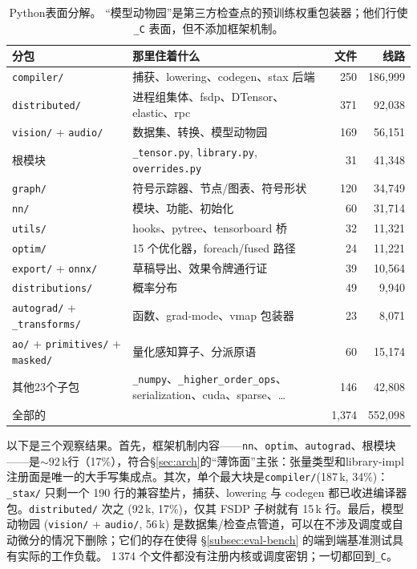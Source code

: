 \begin{table}[H]
\centering
\caption{Python表面分解。 “模型动物园”是第三方检查点的预训练权重包装器；他们行使 \texttt{\_C} 表面，但不添加框架机制。}
\label{tab:pybreakdown}
\small
\begin{tabular}{llrr}
\toprule
分包 & 那里住着什么 & 文件 & 线路 \\
\midrule
\texttt{compiler/} & 捕获、lowering、codegen、stax 后端 & 250 & 186{,}999 \\
\texttt{distributed/} & 进程组集体、fsdp、DTensor、elastic、rpc & 371 & 92{,}038 \\
\texttt{vision/} + \texttt{audio/} & 数据集、转换、模型动物园 & 169 & 56{,}151 \\
根模块 & \texttt{\_tensor.py}, \texttt{library.py}, \texttt{overrides.py} & 31 & 41{,}348 \\
\texttt{graph/} & 符号示踪器、节点/图表、符号形状 & 120 & 34{,}749 \\
\texttt{nn/} & 模块、功能、初始化 & 60 & 31{,}714 \\
\texttt{utils/} & hooks、pytree、tensorboard 桥 & 32 & 11{,}321 \\
\texttt{optim/} & 15 个优化器，foreach/fused 路径 & 24 & 11{,}221 \\
\texttt{export/} + \texttt{onnx/} & 草稿导出、效果令牌通行证 & 39 & 10{,}564 \\
\texttt{distributions/} & 概率分布 & 49 & 9{,}940 \\
\texttt{autograd/} + \texttt{\_transforms/} & 函数、grad-mode、vmap 包装器 & 23 & 8{,}071 \\
\texttt{ao/} + \texttt{primitives/} + \texttt{masked/} & 量化感知算子、分派原语 & 60 & 15{,}174 \\
其他23个子包 & \texttt{\_numpy}、\texttt{\_higher\_order\_ops}、serialization、cuda、sparse、\dots & 146 & 42{,}808 \\
\midrule
全部的 &  & 1{,}374 & 552{,}098 \\
\bottomrule
\end{tabular}
\end{table}

以下是三个观察结果。首先，框架机制内容——\texttt{nn}、\texttt{optim}、\texttt{autograd}、根模块——是$\sim$92\,k行（17\%），符合\S\ref{sec:arch}的“薄饰面”主张：张量类型和library-impl注册面是唯一的大手写集成点。其次，单个最大块是\texttt{compiler/}(187\,k, 34\%)：\texttt{\_stax/} 只剩一个 190 行的兼容垫片，捕获、lowering 与 codegen 都已收进编译器包。\texttt{distributed/} 次之 (92\,k, 17\%)，仅其 FSDP 子树就有 15\,k 行。最后，模型动物园 (\texttt{vision/} + \texttt{audio/}, 56\,k) 是数据集/检查点管道，可以在不涉及调度或自动微分的情况下删除；它们的存在使得 \S\ref{subsec:eval-bench} 的端到端基准测试具有实际的工作负载。 1\,374 个文件都没有注册内核或调度密钥；一切都回到\texttt{\_C}。

